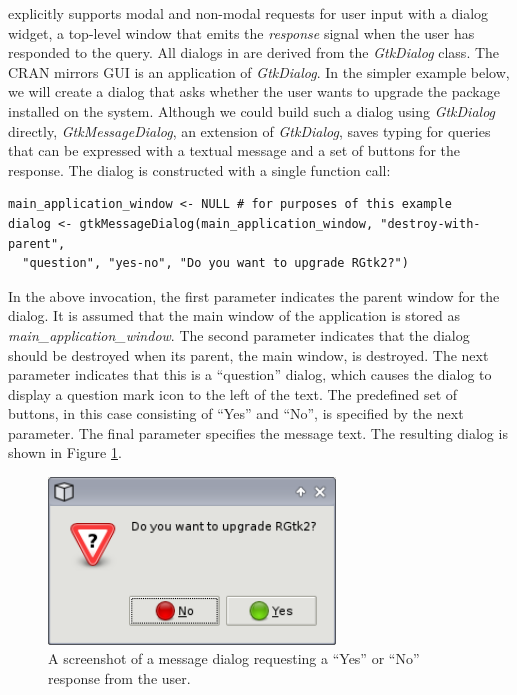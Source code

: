 \documentclass[article]{jss}
\begin{document}
 explicitly supports modal and non-modal requests for user
input with a dialog widget, a top-level window that emits the
\emph{response} signal when the user has responded to the query. All
dialogs in  are derived from the \emph{GtkDialog} class. The
CRAN mirrors GUI is an application of \emph{GtkDialog}. In the simpler
example below, we will create a dialog that asks whether the user
wants to upgrade the  package installed on the
system. Although we could build such a dialog using \emph{GtkDialog}
directly, \emph{GtkMessageDialog}, an extension of \emph{GtkDialog},
saves typing for queries that can be expressed with a textual message
and a set of buttons for the response. The dialog is constructed with
a single function call:
\begin{verbatim}
main_application_window <- NULL # for purposes of this example
dialog <- gtkMessageDialog(main_application_window, "destroy-with-parent", 
  "question", "yes-no", "Do you want to upgrade RGtk2?")
\end{verbatim}
In the above invocation, the first parameter indicates the parent window for
the dialog. It is assumed that the main window of the application is stored 
as \emph{main\_application\_window}. The second parameter indicates that
the dialog should be destroyed when its parent, the main window, is destroyed.
The next parameter indicates that this is a ``question'' dialog, which causes
the dialog to display a question mark icon to the left of the text. The 
predefined set of buttons, in this case consisting of ``Yes'' and ``No'', 
is specified by the next parameter. The final parameter specifies the message text.
The resulting dialog is shown in Figure \ref{fig:upgrade-dialog}.

\begin{figure}
\begin{center}
\includegraphics[width=3in]{upgrade-dialog.png}
\caption{\label{fig:upgrade-dialog}A screenshot of a message dialog requesting a 
``Yes'' or ``No'' response from the user.}
\end{center}
\end{figure}
\end{document}
